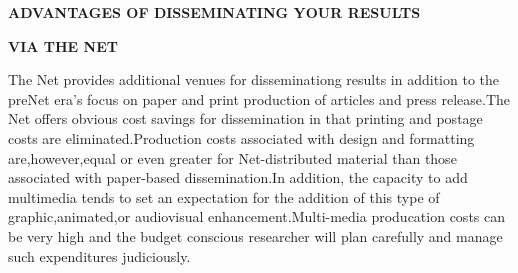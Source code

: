 \documentclass[10pt,a4paper]{article}
\begin{document}
\begin{flushleft}
\normalsize
\textbf{ADVANTAGES OF DISSEMINATING YOUR RESULTS}
  
\textbf{VIA THE NET}
\end{flushleft}

The Net provides additional venues for disseminationg results in addition to the preNet era's focus on paper and print production of articles and press release.The Net offers obvious cost savings for dissemination in that printing and postage costs are eliminated.Production costs associated with design and formatting are,however,equal or even greater for Net-distributed material than those associated with paper-based dissemination.In addition, the capacity to add multimedia tends to set an expectation for the addition of this type of graphic,animated,or audiovisual enhancement.Multi-media producation costs can be very high and the budget conscious researcher will plan carefully and manage such expenditures judiciously.
\end{document}
